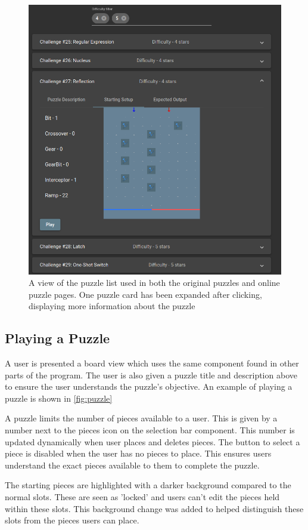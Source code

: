 \documentclass{l4proj}
\begin{document}
\begin{figure}
    \centering
    \includegraphics[width=0.65\linewidth]{images/puzzleList.png}
    \caption{A view of the puzzle list used in both the original puzzles and online puzzle pages. One puzzle card has been expanded after clicking, displaying more information about the puzzle}
    \label{fig:puzzleList}
\end{figure}

\subsection{Playing a Puzzle}
A user is presented a board view which uses the same component found in other parts of the program. The user is also given a puzzle title and description above to ensure the user understands the puzzle's objective. An example of playing a puzzle is shown in \ref{fig:puzzle}

A puzzle limits the number of pieces available to a user. This is given by a number next to the pieces icon on the selection bar component. This number is updated dynamically when user places and deletes pieces. The button to select a piece is disabled when the user has no pieces to place. This ensures users understand the exact pieces available to them to complete the puzzle. 

The starting pieces are highlighted with a darker background compared to the normal slots. These are seen as 'locked' and users can't edit the pieces held within these slots. This background change was added to helped distinguish these slots from the pieces users can place.

\end{document}
